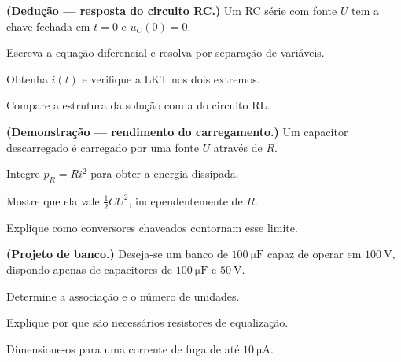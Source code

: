 \blocodesafio
\begin{questao}[4]{}

\textbf{(Dedução --- resposta do circuito RC.)} Um RC série com fonte $U$ tem a
chave fechada em $t=0$ e $u_C(0)=0$.
\begin{itensq}
\item Escreva a equação diferencial e resolva por separação de variáveis.
\item Obtenha $i(t)$ e verifique a LKT nos dois extremos.
\item Compare a estrutura da solução com a do circuito RL.
\end{itensq}


\end{questao}
\begin{questao}[4]{}

\textbf{(Demonstração --- rendimento do carregamento.)} Um capacitor
descarregado é carregado por uma fonte $U$ através de $R$.
\begin{itensq}
\item Integre $p_R=Ri^{2}$ para obter a energia dissipada.
\item Mostre que ela vale $\frac12CU^{2}$, independentemente de $R$.
\item Explique como conversores chaveados contornam esse limite.
\end{itensq}


\end{questao}
\begin{questao}[4]{}

\textbf{(Projeto de banco.)} Deseja-se um banco de $\SI{100}{\micro\farad}$
capaz de operar em $\SI{100}{\volt}$, dispondo apenas de capacitores de
$\SI{100}{\micro\farad}$ e $\SI{50}{\volt}$.
\begin{itensq}
\item Determine a associação e o número de unidades.
\item Explique por que são necessários resistores de equalização.
\item Dimensione-os para uma corrente de fuga de até
      $\SI{10}{\micro\ampere}$.
\end{itensq}


\end{questao}
